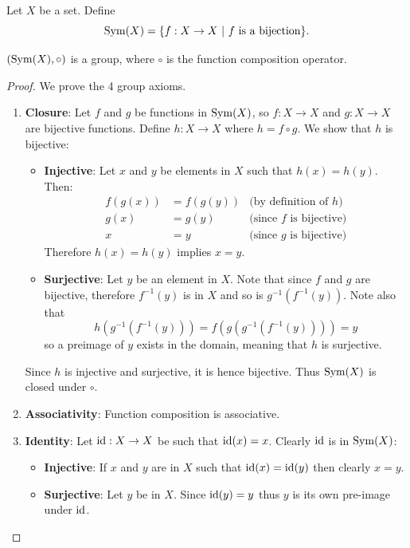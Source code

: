 \begin{definition}
    Let $X$ be a set. Define
    \[
        \mathrm{Sym}(X) = \{f: X \to X \ | \ f \text{ is a bijection}\}.
    \]
\end{definition}
\begin{proposition}
    $(\mathrm{Sym}(X), \circ)$ is a group, where $\circ$ is the function composition operator.
\end{proposition}
\begin{proof}
    We prove the 4 group axioms.
    \begin{enumerate}
        \item \textbf{Closure}: Let $f$ and $g$ be functions in $\mathrm{Sym}(X)$, so $f: X\to X$ and $g:X \to X$ are bijective functions. Define $h:X \to X$ where $h = f\circ g$. We show that $h$ is bijective:
        \begin{itemize}
            \item \textbf{Injective}: Let $x$ and $y$ be elements in $X$ such that $h(x) = h(y)$. Then:
            \begin{align*}
                f(g(x)) &= f(g(y)) & \text{(by definition of } h \text{)}\\
                g(x) &= g(y) & \text{(since } f \text{ is bijective)}\\
                x &= y & \text{(since } g \text{ is bijective)}
            \end{align*}
            Therefore $h(x) = h(y)$ implies $x = y$.
            \item \textbf{Surjective}: Let $y$ be an element in $X$. Note that since $f$ and $g$ are bijective, therefore $f^{-1}(y)$ is in $X$ and so is $g^{-1}(f^{-1}(y))$. Note also that
            \[
                h(g^{-1}(f^{-1}(y))) = f(g(g^{-1}(f^{-1}(y)))) = y
            \]
            so a preimage of $y$ exists in the domain, meaning that $h$ is surjective.
        \end{itemize}
        Since $h$ is injective and surjective, it is hence bijective. Thus $\mathrm{Sym}(X)$ is closed under $\circ$.
        \item \textbf{Associativity}: Function composition is associative.
        \item \textbf{Identity}: Let $\mathrm{id} : X \to X$ be such that $\mathrm{id}(x) = x$. Clearly $\mathrm{id}$ is in $\mathrm{Sym}(X)$:
        \begin{itemize}
            \item \textbf{Injective}: If $x$ and $y$ are in $X$ such that $\mathrm{id}(x) = \mathrm{id}(y)$ then clearly $x = y$.
            \item \textbf{Surjective}: Let $y$ be in $X$. Since $\mathrm{id}(y) = y$ thus $y$ is its own pre-image under $\mathrm{id}$.

\end{itemize}
\end{enumerate}
\end{proof}
